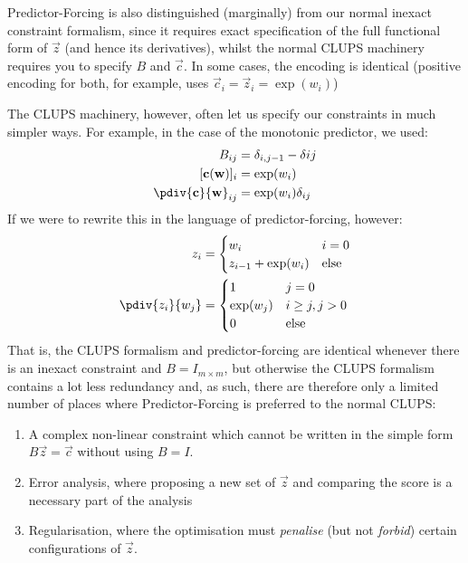 \documentclass[]{article}
\begin{document}
		Predictor-Forcing is also distinguished (marginally) from our normal inexact constraint formalism, since it requires exact specification of the full functional form of $\vec{z}$ (and hence its derivatives), whilst the normal CLUPS machinery requires you to specify $B$ and $\vec{c}$. In some cases, the encoding is identical (positive encoding for both, for example, uses $\vec{c}_i = \vec{z}_i = \exp(w_i)$)
		
		The CLUPS machinery, however, often let us specify our constraints in much simpler ways. For example, in the case of the monotonic predictor, we used:
		\begin{align}
			B_{ij} & = \delta_{i,j-1} - \delta{ij}
			\\
			[\vec{c}(\vec{w})]_i & = \exp(w_i)
			\\
			\pdiv{\vec{c}}{\vec{w}}_{ij} & = \exp(w_i) \delta_{ij}
		\end{align}
		If we were to rewrite this in the language of predictor-forcing, however:
		\begin{align}
			z_i & = \begin{cases} w_i & i = 0
				\\
				 z_{i-1} + \exp(w_i) & \text{else}\end{cases}
			\\
			\pdiv{z_i}{w_j} & = \begin{cases}
				1 & j = 0
				\\
				\exp(w_j) & i \geq j, j > 0
				\\
				0 & \text{else}
			\end{cases}
		\end{align}
		That is, the CLUPS formalism and predictor-forcing are identical whenever there is an inexact constraint and $B = I_{m\times m}$, but otherwise the CLUPS formalism contains a lot less redundancy and, as such, there are therefore only a limited number of places where Predictor-Forcing is preferred to the normal CLUPS:

		\begin{enumerate}
			\item A complex non-linear constraint which cannot be written in the simple form $B\vec{z} = \vec{c}$ without using $B = I$.
			\item Error analysis, where proposing a new set of $\vec{z}$ and comparing the score is a necessary part of the analysis
			\item Regularisation, where the optimisation must \textit{penalise} (but not \textit{forbid}) certain configurations of $\vec{z}$.
		\end{enumerate}
\end{document}
